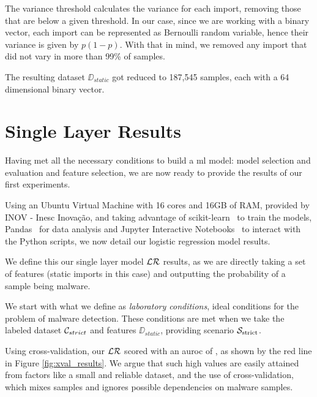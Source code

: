 The variance threshold calculates the variance for each import, removing those that are below a given threshold.
In our case, since we are working with a binary vector, each import can be represented as Bernoulli random variable, hence their variance is given by $p(1-p)$.
With that in mind, we removed any import that did not vary in more than 99\% of samples.

The resulting dataset $\DD_{static}$ got reduced to 187,545 samples, each with a 64 dimensional binary vector.

\section{Single Layer Results}
\label{section:single_layer_results}

Having met all the necessary conditions to build a \gls{ml} model: model selection and evaluation and feature selection, we are now ready to provide the results of our first experiments.

Using an Ubuntu Virtual Machine with 16 cores and 16GB of RAM, provided by INOV - Inesc Inovação, and taking advantage of scikit-learn~\cite{tool:sklearn} to train the models, Pandas~\cite{tool:pandas} for data analysis and Jupyter Interactive Notebooks~\cite{tool:jupyter} to interact with the Python scripts, we now detail our logistic regression model results.

We define this our single layer model $\mathcal{LR}$ results, as we are directly taking a set of features (static imports in this case) and outputting the probability of a sample being malware.

\medskip

We start with what we define as \textit{laboratory conditions}, ideal conditions for the problem of malware detection.
These conditions are met when we take the labeled dataset $\mathcal{C}_{strict}$ and features $\DD_{static}$, providing scenario $\mathcal{S}_{\mathrm{strict}}$.

Using cross-validation, our $\mathcal{LR}$ scored with an \gls{auroc} of , as shown by the red line in Figure \ref{fig:xval_results}.
We argue that such high values are easily attained from factors like a small and reliable dataset, and the use of cross-validation, which mixes samples and ignores possible dependencies on malware samples.

